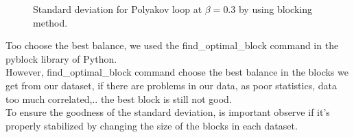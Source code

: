 \begin{figure}[H]
                \caption{Standard deviation for Polyakov loop at $\beta=0.3$ by using blocking method.}
                \label{fig:blocking_Polyakov} 
                
            \end{figure}
            \noindent
            Too choose the best balance, we used the find\_optimal\_block command in the pyblock library of Python. \\
            However, find\_optimal\_block command choose the best balance in the blocks we get from our dataset, if there are problems in our data, as poor statistics,
            data too much correlated,.. the best block is still not good. \\
            To ensure the goodness of the standard deviation, is important observe if it's properly stabilized by changing the size of the blocks in each dataset.
            \noindent
